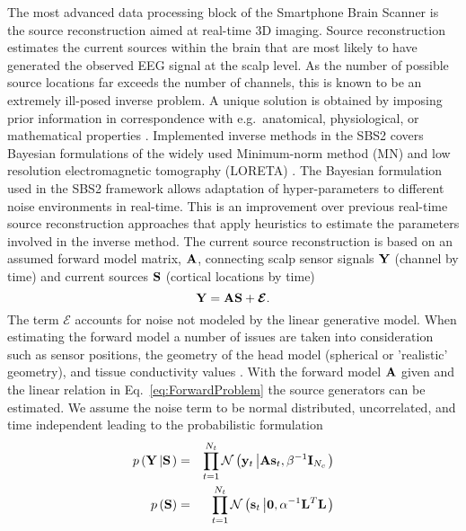 \documentclass[10pt]{article}
\newcommand{\bm}[1]{\boldsymbol{#1}}
\def\Npdf{{\mathcal N}}		\def\Gpdf{{\mathcal G}}		\def\Wpdf{{\mathcal W}}		\def\L{{\mathcal L}}		\def\F{{\mathcal F}}
\def\E{\bm {\mathcal{E}}}
\begin{document}
The most advanced data processing block of the Smartphone Brain Scanner is the source reconstruction aimed at real-time 3D imaging. Source reconstruction estimates the current sources within the brain that are most likely to have generated the observed EEG signal at the scalp level. As the number of possible source locations far exceeds the number of channels, this is known to be an extremely ill-posed inverse problem. A unique solution is obtained by imposing prior information in correspondence with e.g.~anatomical, physiological, or mathematical properties \cite{Baillet1997:BayesianAnatomFuncPrior,Phillips2002:AnaInformedBasis,Hamalainen1994:MNE}. Implemented inverse methods in the SBS2 covers Bayesian formulations of the widely used Minimum-norm method (MN) \cite{Hamalainen1994:MNE} and low resolution electromagnetic tomography (LORETA) \cite{PascualMarqui1994:LORETA}. The Bayesian formulation used in the SBS2 framework allows adaptation of hyper-parameters to different noise environments in real-time.
This is an improvement over previous real-time source reconstruction approaches \cite{Congedo2006:ClassificationByElectromagneticInverseSol,Noirhomme2008:SingleTrialEEGSourceReconBCI,Besserve2011:ImprovingQuantificationFunctionalNetworks} that apply heuristics to estimate the parameters involved in the inverse method.
The current source reconstruction is based on an assumed forward model matrix, $\bf A$, connecting scalp sensor signals ${\bf Y}$ (channel by time) and current sources ${\bf S}$ (cortical locations by time) \cite{Baillet2001:BrainMapping}
\begin{equation}\label{eq:ForwardProblem}
    {\bf Y} = {\bf AS} + {\E}.
\end{equation}
The term ${\E}$ accounts for noise not modeled by the linear generative model.
When estimating the forward model a number of issues are taken into consideration such as sensor positions, the geometry of the head model (spherical or 'realistic' geometry), and tissue conductivity values \cite{Wolters2007:NumercalMathematicsFEM,Hallez2007:reviewForwardProblem,Drechsler2009:FullSubtractionFEM}. With the  forward model $\bf A$ given and the linear relation in Eq.~\eqref{eq:ForwardProblem} the source generators can be estimated.
We assume the noise term to be normal distributed, uncorrelated, and time independent leading to the probabilistic formulation
\begin{eqnarray}\label{eq:Likelihood}
p \left( {{\bf Y} \left| {\bf S} \right. } \right) &=& { \prod_{t=1}^{N_t} {\Npdf} \left( {{\bf y}_t \left| {{\bf As}_t ,\beta^{-1}{\bf I}_{N_c } } \right.} \right)} \\
p \left( {\bf S} \right) &=& { \prod_{t=1}^{N_t} {\Npdf} \left( {{\bf s}_t \left| {{\bf 0} ,\alpha^{-1}{\bf L}^T {\bf L} } \right.} \right)}
\end{eqnarray}
\end{document}
